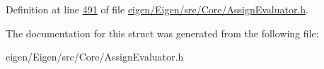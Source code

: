Definition at line \hyperlink{eigen_2_eigen_2src_2_core_2_assign_evaluator_8h_source_l00491}{491} of file \hyperlink{eigen_2_eigen_2src_2_core_2_assign_evaluator_8h_source}{eigen/\+Eigen/src/\+Core/\+Assign\+Evaluator.\+h}.



The documentation for this struct was generated from the following file\+:\begin{DoxyCompactItemize}
\item 
eigen/\+Eigen/src/\+Core/\+Assign\+Evaluator.\+h\end{DoxyCompactItemize}
